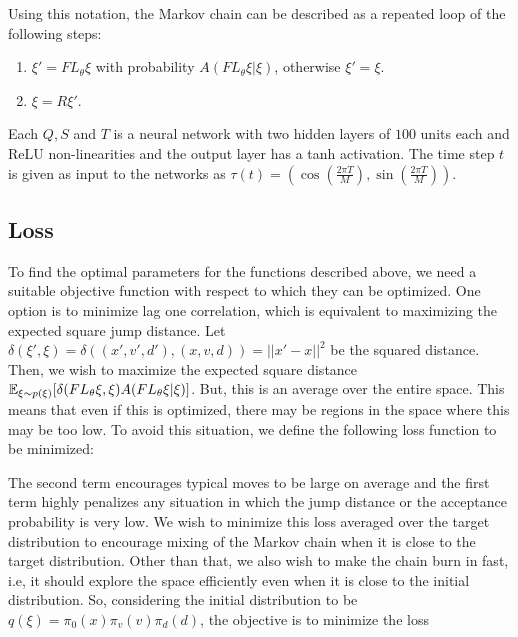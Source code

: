 \documentclass[letterpaper,english,10pt]{article}
\begin{document}
Using this notation, the Markov chain can be described as a repeated loop of the following steps:

\begin{enumerate}
\item $\xi' = FL_\theta \xi$ with probability $A(FL_\theta \xi | \xi)$, otherwise $\xi' = \xi$.
\item $\xi = R \xi'$.
\end{enumerate}

Each $Q,S$ and $T$ is a neural network with two hidden layers of $100$ units each and ReLU non-linearities and the output layer has a tanh activation. The time step $t$ is given as input to the networks as $\tau(t) = ( \cos(\frac{2 \pi T}{M}), \sin(\frac{2 \pi T}{M}) )$. \\

\subsection{Loss}
To find the optimal parameters for the functions described above, we need a suitable objective function with respect to which they can be optimized. One option is to minimize lag one correlation, which is equivalent to maximizing the expected square jump distance. Let $\delta (\xi', \xi) = \delta ( (x', v', d'), (x, v, d) ) = ||x' - x||^2$ be the squared distance. Then, we wish to maximize the expected square distance $\mathbb{E}_{\xi \sim p(\xi)} [\delta(FL_\theta \xi, \xi) A(FL_\theta \xi | \xi)]$. But, this is an average over the entire space. This means that even if this is optimized, there may be regions in the space where this may be too low. To avoid this situation, we define the following loss function to be minimized:


The second term encourages typical moves to be large on average and the first term highly penalizes any situation in which the jump distance or the acceptance probability is very low. We wish to minimize this loss averaged over the target distribution to encourage mixing of the Markov chain when it is close to the target distribution. Other than that, we also wish to make the chain burn in fast, i.e, it should explore the space efficiently even when it is close to the initial distribution. So, considering the initial distribution to be $q(\xi) = \pi_0(x) \pi_v(v) \pi_d(d)$, the objective is to minimize the loss
\end{document}
